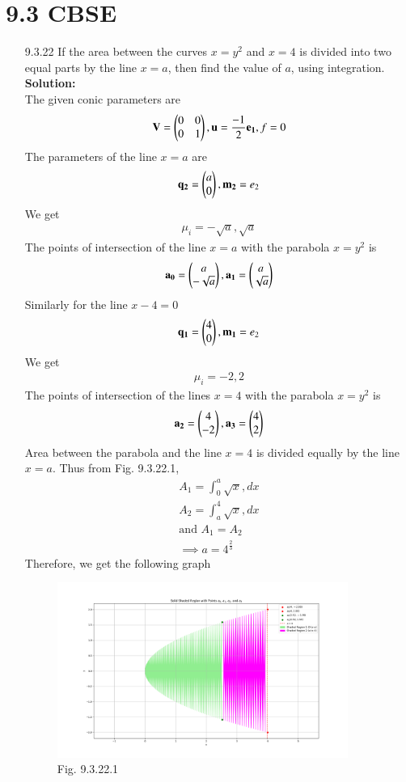 \documentclass[journal]{IEEEtran}
\begin{document}
\section{9.3 CBSE}
\begin{enumerate}
\item [9.3.22] If the area between the curves $x=y^2$ and $x=4$ is divided into two equal parts by the line $x=a$, then find the value of $a$, using integration.\\
\textbf{Solution:}\\
The given conic parameters are
\begin{align}
    \mathbf{V} = \begin{pmatrix}0 & 0\\0 & 1\end{pmatrix}, \mathbf{u} = \frac{-1}{2}\mathbf{e_1}, f = 0
\end{align}
The parameters of the line $x=a$ are
\begin{align}
    \mathbf{q_2} = \begin{pmatrix}a\\0\end{pmatrix}, \mathbf{m_2} = e_2
\end{align}
We get
\begin{align}
    \mu_i = -\sqrt{a},\sqrt{a}
\end{align}
The points of intersection of the line $x=a$ with the parabola $x=y^2$ is 
\begin{align}
    \mathbf{a_0} = \begin{pmatrix}a\\-\sqrt{a}\end{pmatrix}, \mathbf{a_1} = \begin{pmatrix}a\\\sqrt{a}\end{pmatrix}
\end{align}
Similarly for the line $x-4=0$
\begin{align}
    \mathbf{q_1} = \begin{pmatrix}4\\0\end{pmatrix}, \mathbf{m_1} = e_2
\end{align}
We get
\begin{align}
    \mu_i = -2,2
\end{align}
The points of intersection of the lines $x=4$ with the parabola $x=y^2$ is
\begin{align}
    \mathbf{a_2} = \begin{pmatrix}4\\-2\end{pmatrix}, \mathbf{a_3} = \begin{pmatrix}4\\2\end{pmatrix}
\end{align}
Area between the parabola and the line $x=4$ is divided equally by the line $x=a$. Thus from Fig. 9.3.22.1,
\begin{align}
    A_1 = \int_0^a \sqrt{x}, dx\\
    A_2 = \int_a^4 \sqrt{x}, dx\\
    \text{and } A_1 = A_2\\
    \implies a = 4^{\frac{2}{3}}
\end{align}
Therefore, we get the following graph
\begin{figure}[h!]
    \centering
    \includegraphics[width=9.5cm]{figs/figure.png}
    \caption*{Fig. 9.3.22.1}
    \label{}
\end{figure}
\end{enumerate}
\end{document}
